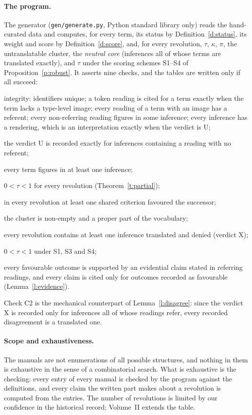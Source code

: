 \documentclass{situationist-preprint}
\begin{document}
\paragraph{The program.} The generator (\texttt{gen/generate.py}, Python standard library only) reads the hand-curated data and computes, for every term, its status by Definition~\ref{d:status}, its weight and score by Definition~\ref{d:score}, and, for every revolution, $\tau$, $\kappa$, $\pi$, the untranslatable cluster, the \emph{neutral core} (inferences all of whose terms are translated exactly), and $\tau$ under the scoring schemes S1--S4 of Proposition~\ref{p:robust}. It asserts nine checks, and the tables are written only if all succeed:
\begin{description}[leftmargin=2.2em,style=sameline]
\item[C1] integrity: identifiers unique; a token reading is cited for a term exactly when the term lacks a type-level image; every reading of a term with an image has a referent; every non-referring reading figures in some inference; every inference has a rendering, which is an interpretation exactly when the verdict is U;
\item[C2] the verdict U is recorded exactly for inferences containing a reading with no referent;
\item[C3] every term figures in at least one inference;
\item[C4] $0<\tau<1$ for every revolution (Theorem~\ref{t:partial});
\item[C5] in every revolution at least one shared criterion favoured the successor;
\item[C6] the cluster is non-empty and a proper part of the vocabulary;
\item[C7] every revolution contains at least one inference translated and denied (verdict X);
\item[C8] $0<\tau<1$ under S1, S3 and S4;
\item[C9] every favourable outcome is supported by an evidential claim stated in referring readings, and every claim is cited only for outcomes recorded as favourable (Lemma~\ref{l:evidence}).
\end{description}
Check C2 is the mechanical counterpart of Lemma~\ref{l:disagree}: since the verdict X is recorded only for inferences all of whose readings refer, every recorded disagreement is a translated one.

\paragraph{Scope and exhaustiveness.} The manuals are not enumerations of all possible structures, and nothing in them is exhaustive in the sense of a combinatorial search. What is exhaustive is the checking: every entry of every manual is checked by the program against the definitions, and every claim the written part makes about a revolution is computed from the entries. The number of revolutions is limited by our confidence in the historical record; Volume~II extends the table.
\end{document}
